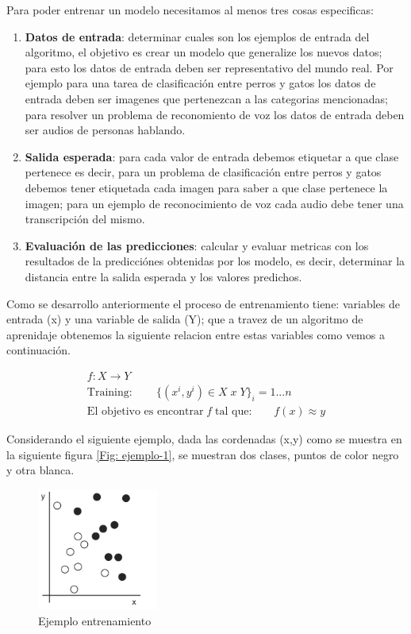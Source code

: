 Para poder entrenar un modelo necesitamos al menos tres cosas especificas:
\begin{enumerate}
\item \textbf{Datos de entrada}: determinar cuales son los ejemplos de entrada del algoritmo, el objetivo es crear un modelo que generalize los nuevos datos; para esto los datos de entrada deben ser representativo del mundo real. Por ejemplo para una tarea de clasificación entre perros y gatos los datos de entrada deben ser imagenes que pertenezcan a las categorias mencionadas; para resolver un problema de reconomiento de voz los datos de entrada deben ser audios de personas hablando.

\item \textbf{Salida esperada}: para cada valor de entrada debemos etiquetar a que clase pertenece es decir, para un problema de clasificación entre perros y gatos debemos tener etiquetada cada imagen para saber a que clase pertenece la imagen; para un ejemplo de reconocimiento de voz cada audio debe tener una transcripción del mismo.

\item \textbf{Evaluación de las predicciones}: calcular y evaluar metricas con los resultados de la predicciónes obtenidas por los modelo, es decir, determinar la distancia entre la salida esperada y los valores predichos.
\end{enumerate}

Como se desarrollo anteriormente el proceso de entrenamiento tiene: variables de entrada (x) y una variable de salida (Y); que a travez de un algoritmo de aprenidaje obtenemos la siguiente relacion entre estas variables como vemos a continuación.


\begin{eqnarray}
 f:X \longrightarrow Y\\
 \mbox{Training}:\qquad \{(x^i, y^i) \in X\; x\; Y \} _i=1...n\\
 \mbox{El objetivo es encontrar}\; f\; \mbox{tal que:}\qquad f(x)\approx y
\end{eqnarray}

Considerando el siguiente ejemplo, dada las cordenadas (x,y) como se muestra en la siguiente figura \ref{Fig: ejemplo-1}, se muestran dos clases, puntos de color negro y otra blanca.
\begin{figure}[H] \centering
  \includegraphics[height=4cm,keepaspectratio=true,clip=true]{imagenes/MarcoTeorico/sample.png}
  \caption{Ejemplo entrenamiento}\label{Fig:ejemplo-1}
\end{figure}

